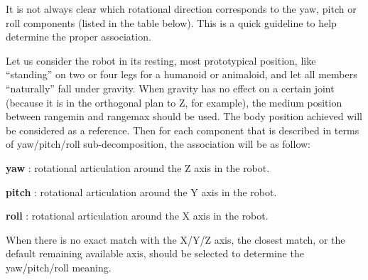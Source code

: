 \documentclass[a4paper]{article}
\begin{document}
It is not always clear which rotational direction corresponds to the
yaw, pitch or roll components (listed in the table below). This is a
quick guideline to help determine the proper association.


Let us consider the robot in its resting, most prototypical position,
like “standing” on two or four legs for a humanoid or animaloid, and
let all members “naturally” fall under gravity. When gravity has no
effect on a certain joint (because it is in the orthogonal plan to Z,
for example), the medium position between rangemin and rangemax should
be used. The body position achieved will be considered as a reference.
Then for each component that is described in terms of yaw/pitch/roll
sub-decomposition, the association will be as follow:

{
\textsf{\textbf{ yaw}}\textsf{ : rotational articulation around the Z
axis in the robot.}}


\textbf{ pitch} : rotational articulation around the Y axis in the
robot.


\textbf{ roll} : rotational articulation around the X axis in the
robot.


When there is no exact match with the X/Y/Z axis, the closest match, or
the default remaining available axis, should be selected to determine
the yaw/pitch/roll meaning.
\end{document}

